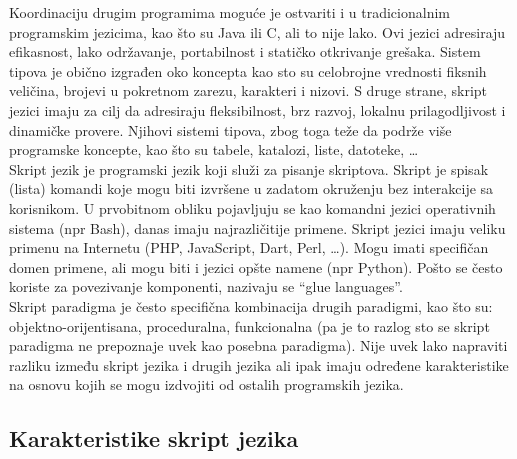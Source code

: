 \documentclass[../main.tex]{subfiles}
\begin{document}
Koordinaciju drugim programima moguće je ostvariti i u tradicionalnim programskim jezicima, kao što su Java ili C, ali to nije lako. Ovi jezici adresiraju efikasnost, lako održavanje, portabilnost i statičko otkrivanje grešaka. Sistem tipova je obično izgrađen oko koncepta kao sto su celobrojne vrednosti fiksnih veličina, brojevi u pokretnom zarezu, karakteri i nizovi. S druge strane, skript jezici imaju za cilj da adresiraju fleksibilnost, brz razvoj, lokalnu prilagodljivost i dinamičke provere. Njihovi sistemi tipova, zbog toga teže da podrže više programske koncepte, kao što su tabele, katalozi, liste, datoteke, \ldots \\
Skript jezik je programski jezik koji služi za pisanje skriptova. Skript je spisak (lista) komandi koje mogu biti izvršene u zadatom okruženju bez interakcije sa korisnikom. U prvobitnom obliku pojavljuju se kao komandni jezici operativnih sistema (npr Bash), danas imaju najrazličitije primene. Skript jezici imaju veliku primenu na Internetu (PHP, JavaScript, Dart, Perl, \ldots). Mogu imati specifičan domen primene, ali mogu biti i jezici opšte namene (npr Python). Pošto se često koriste za povezivanje komponenti, nazivaju se ``glue languages''.
\\
Skript paradigma je često specifična kombinacija drugih paradigmi, kao što su: objektno-orijentisana, proceduralna, funkcionalna (pa je to razlog sto se skript paradigma ne prepoznaje uvek kao posebna paradigma). Nije uvek lako napraviti razliku između skript jezika i drugih jezika ali ipak imaju određene karakteristike na osnovu kojih se mogu izdvojiti od ostalih programskih jezika.

\subsection{Karakteristike skript jezika}											%
\end{document}
